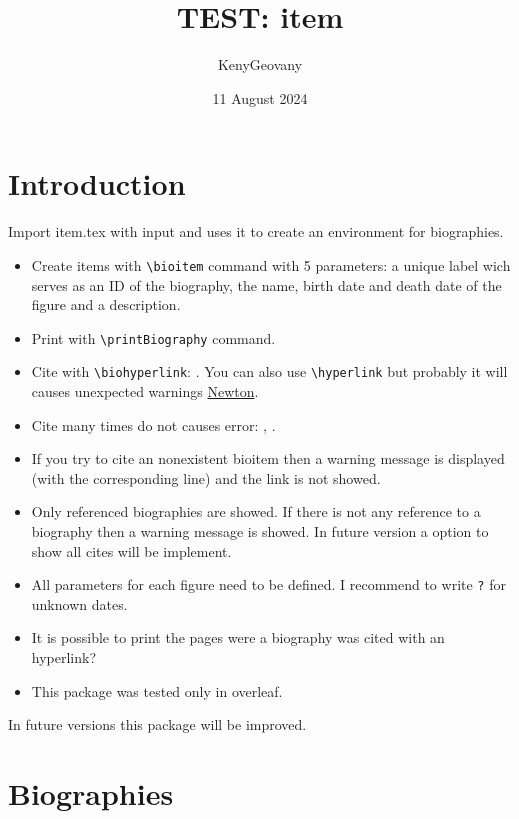 \documentclass{article}
\title{TEST: item}
\author{KenyGeovany}
\date{11 August 2024}
\begin{document}
\maketitle

\section{Introduction}
Import item.tex with input and uses it to create an environment for biographies. 

\begin{itemize}
    \item Create items with \verb|\bioitem| command with 5 parameters: a unique label wich serves as an ID of the biography, the name, birth date and death date of the figure and a description.
    \item Print with \verb|\printBiography| command.
    \item Cite with \verb|\biohyperlink|: . You can also use \verb|\hyperlink| but probably it will causes unexpected warnings \hyperlink{bioNewton}{Newton}.
    \item Cite many times do not causes error: , .
    \item If you try to cite an nonexistent bioitem then a warning message is displayed (with the corresponding line) and the link is not showed.
    \item Only referenced biographies are showed. If there is not any reference to a biography then a warning message is showed. In future version a option to show all cites will be implement.
    \item All parameters for each figure need to be defined. I recommend to write \verb|?| for unknown dates.
    \item It is possible to print the pages were a biography was cited with an hyperlink?
    \item This package was tested only in overleaf.
\end{itemize}

In future versions this package will be improved.

\section{Biographies}

\printBiography
\end{document}
